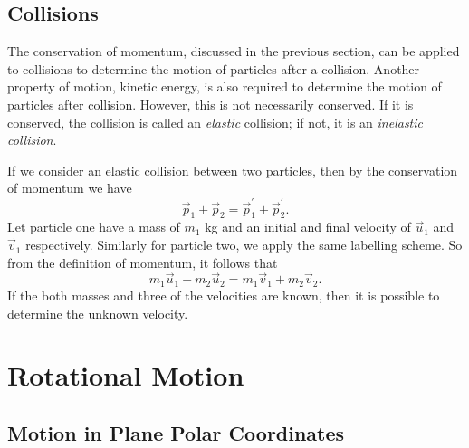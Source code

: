 \subsection{Collisions}

The conservation of momentum, discussed in the previous section, can be applied to collisions to determine the motion of particles after a collision. Another property of motion, kinetic energy, is also required to determine the motion of particles after collision. However, this is not necessarily conserved. If it is conserved, the collision is called an \textit{elastic} collision; if not, it is an \textit{inelastic collision}.  

If we consider an elastic collision between two particles, then by the conservation of momentum we have
\begin{equation}
    \vec{p}_1 + \vec{p}_2 = \vec{p}_1^{'} + \vec{p}_2^{'}.
\end{equation}
Let particle one have a mass of $m_1$ kg and an initial and final velocity of $\vec{u}_1$ and $\vec{v}_1$ respectively. Similarly for particle two, we apply the same labelling scheme. So from the definition of momentum, it follows that
\begin{equation}
    m_1 \vec{u}_1 + m_2 \vec{u}_2 = m_1 \vec{v}_1 + m_2 \vec{v}_2.
\end{equation}
If the both masses and three of the velocities are known, then it is possible to determine the unknown velocity.

\section{Rotational Motion}

\subsection{Motion in Plane Polar Coordinates}


